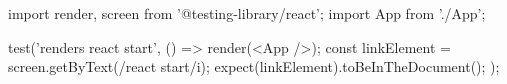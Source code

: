 import { render, screen } from '@testing-library/react';
import App from './App';

test('renders react start', () => {
  render(<App />);
  const linkElement = screen.getByText(/react start/i);
  expect(linkElement).toBeInTheDocument();
});
